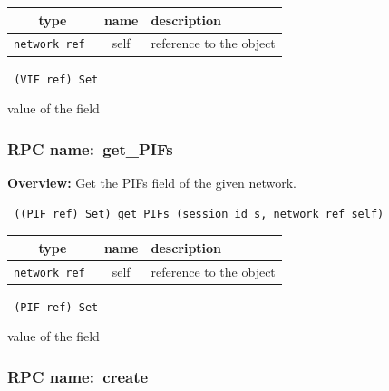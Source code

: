 
 
\vspace{0.3cm}
\begin{tabular}{|c|c|p{7cm}|}
 \hline
{\bf type} & {\bf name} & {\bf description} \\ \hline
{\tt network ref } & self & reference to the object \\ \hline 

\end{tabular}

\vspace{0.3cm}

{\tt 
(VIF ref) Set
}


value of the field
\vspace{0.3cm}
\vspace{0.3cm}
\vspace{0.3cm}
\subsubsection{RPC name:~get\_PIFs}

{\bf Overview:} 
Get the PIFs field of the given network.

\begin{verbatim} ((PIF ref) Set) get_PIFs (session_id s, network ref self)\end{verbatim}



 
\vspace{0.3cm}
\begin{tabular}{|c|c|p{7cm}|}
 \hline
{\bf type} & {\bf name} & {\bf description} \\ \hline
{\tt network ref } & self & reference to the object \\ \hline 

\end{tabular}

\vspace{0.3cm}

{\tt 
(PIF ref) Set
}


value of the field
\vspace{0.3cm}
\vspace{0.3cm}
\vspace{0.3cm}
\subsubsection{RPC name:~create}

